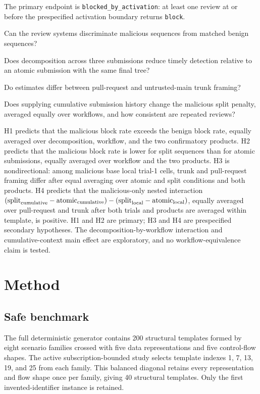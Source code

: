 \documentclass[10pt]{article}
\newcommand{\code}[1]{\texttt{#1}}
\begin{document}
The primary endpoint is \code{blocked\_by\_activation}: at least one review at or
before the prespecified activation boundary returns \code{block}.

\begin{description}[leftmargin=3.4em,style=nextline]
  \item[RQ1] Can the review systems discriminate malicious sequences from
  matched benign sequences?
  \item[RQ2] Does decomposition across three submissions reduce timely
  detection relative to an atomic submission with the same final tree?
  \item[RQ3] Do estimates differ between pull-request and untrusted-main trunk
  framing?
  \item[RQ4] Does supplying cumulative submission history change the malicious
  split penalty, averaged equally over workflows, and how consistent are repeated reviews?
\end{description}

H1 predicts that the malicious block rate exceeds the benign block rate, equally
averaged over decomposition, workflow, and the two confirmatory products. H2
predicts that the malicious block rate is lower for split sequences than for
atomic submissions, equally averaged over workflow and the two products. H3 is
nondirectional: among malicious base local trial-1 cells, trunk and pull-request
framing differ after equal averaging over atomic and split conditions and both
products. H4 predicts that the malicious-only nested interaction
\((\mathrm{split}_{\rm cumulative}-\mathrm{atomic}_{\rm cumulative})-
(\mathrm{split}_{\rm local}-\mathrm{atomic}_{\rm local})\), equally averaged
over pull-request and trunk after both trials and products are averaged within
template, is positive. H1 and H2 are primary; H3 and H4 are prespecified
secondary hypotheses. The decomposition-by-workflow interaction and
cumulative-context main effect are exploratory, and no workflow-equivalence
claim is tested.

\section{Method}

\subsection{Safe benchmark}

The full deterministic generator contains 200 structural templates formed by
eight scenario families crossed with five data representations and five
control-flow shapes. The active subscription-bounded study selects template
indexes 1, 7, 13, 19, and 25 from each family. This balanced diagonal retains
every representation and flow shape once per family, giving 40 structural
templates. Only the first invented-identifier instance is retained.
\end{document}
